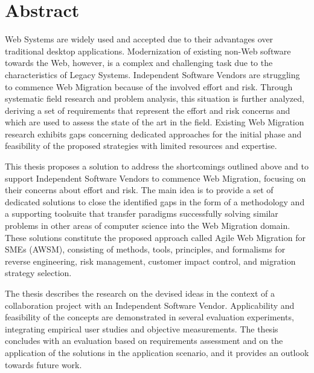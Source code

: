 %
\chapter*{Abstract}
\label{chp:abstract}

Web Systems are widely used and accepted due to their advantages over traditional desktop applications.
Modernization of existing non-Web software towards the Web, however, is a complex and challenging task due to the characteristics of Legacy Systems.
Independent Software Vendors are struggling to commence Web Migration because of the involved effort and risk.
Through systematic field research and problem analysis, this situation is further analyzed, deriving a set of requirements that represent the effort and risk concerns and which are used to assess the state of the art in the field.
Existing Web Migration research exhibits gaps concerning dedicated approaches for the initial phase and feasibility of the proposed strategies with limited resources and expertise.

This thesis proposes a solution to address the shortcomings outlined above and to support Independent Software Vendors to commence Web Migration, focusing on their concerns about effort and risk.
The main idea is to provide a set of dedicated solutions to close the identified gaps in the form of a methodology and a supporting toolsuite that transfer paradigms successfully solving similar problems in other areas of computer science into the Web Migration domain.
These solutions constitute the proposed approach called Agile Web Migration for SMEs (AWSM), consisting of methods, tools, principles, and formalisms for reverse engineering, risk management, customer impact control, and migration strategy selection.

The thesis describes the research on the devised ideas in the context of a collaboration project with an Independent Software Vendor.
Applicability and feasibility of the concepts are
demonstrated in several evaluation experiments, integrating empirical user studies and objective measurements.
The thesis concludes with an evaluation based on requirements assessment and on the application of the solutions in the application scenario, and it provides an outlook towards future work.



\cleardoublepage